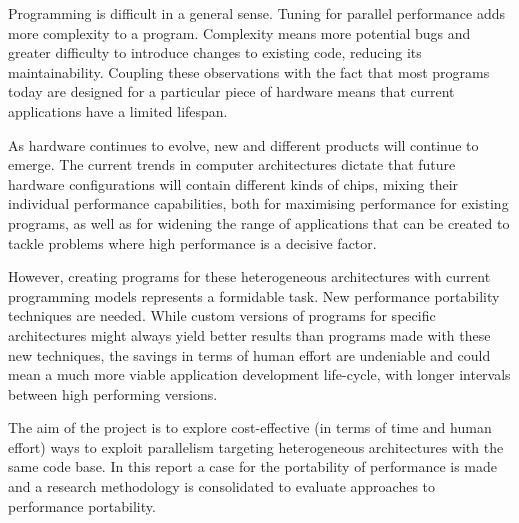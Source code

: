 %
{\singlespacing


Programming is difficult in a general sense. Tuning for parallel performance adds more complexity to a program. Complexity means more potential bugs and greater difficulty to introduce changes to existing code, reducing its maintainability. Coupling these observations with the fact that most programs today are designed for a particular piece of hardware means that current applications have a limited lifespan. 

As hardware continues to evolve, new and different products will continue to emerge. The current trends in computer architectures dictate that future hardware configurations will contain different kinds of chips, mixing their individual performance capabilities, both for maximising performance for existing programs, as well as for widening the range of applications that can be created to tackle problems where high performance is a decisive factor.

However, creating programs for these heterogeneous architectures with current programming models represents a formidable task. New performance portability techniques are needed. While custom versions of programs for specific architectures might always yield better results than programs made with these new techniques, the savings in terms of human effort are undeniable and could mean a much more viable application development life-cycle, with longer intervals between high performing versions.

The aim of the project is to explore cost-effective (in terms of time and human effort) ways to exploit parallelism targeting heterogeneous architectures with the same code base. In this report a case for the portability of performance is made and a research methodology is consolidated to evaluate approaches to performance portability.

}
